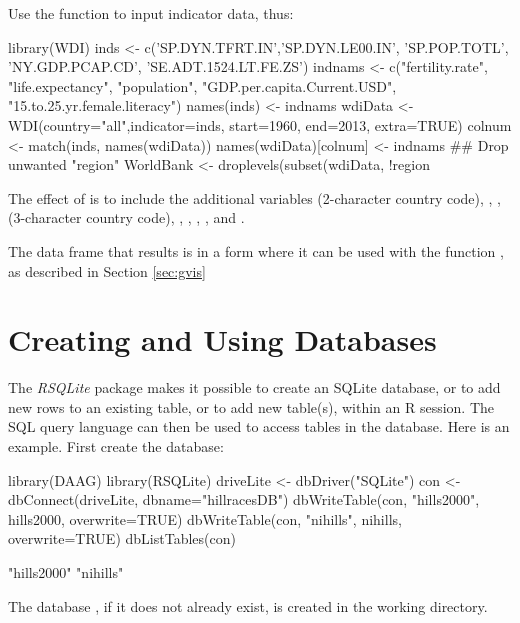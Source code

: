Use the function  to input indicator data, thus:
\begin{fullwidth}
\begin{Schunk}
\begin{Sinput}
library(WDI)
inds <- c('SP.DYN.TFRT.IN','SP.DYN.LE00.IN', 'SP.POP.TOTL',
 'NY.GDP.PCAP.CD', 'SE.ADT.1524.LT.FE.ZS')
indnams <- c("fertility.rate", "life.expectancy", "population",
             "GDP.per.capita.Current.USD", "15.to.25.yr.female.literacy")
names(inds) <- indnams
wdiData <- WDI(country="all",indicator=inds, start=1960, end=2013, extra=TRUE)
colnum <- match(inds, names(wdiData))
names(wdiData)[colnum] <- indnams
## Drop unwanted "region"
WorldBank <- droplevels(subset(wdiData, !region %in% "Aggregates"))
\end{Sinput}
\end{Schunk}
\end{fullwidth}
The effect of  is to include the additional variables
 (2-character country code), , ,
 (3-character country code), ,
, , ,  and
.

The data frame  that results is in a form where it can
be used with the  function ,
as described in Section \ref{sec:gvis}

\section{Creating and Using Databases}\label{ss:dbase}

The \textit{RSQLite} package makes it possible to create an
SQLite database, or to add new rows to an existing table,
or to add new table(s), within an R session. The SQL query
language can then be used to access tables in the database.
Here is an example. First create the database:

\noindent
\begin{Schunk}
\begin{Sinput}
library(DAAG)
library(RSQLite)
driveLite <- dbDriver("SQLite")
con <- dbConnect(driveLite, dbname="hillracesDB")
dbWriteTable(con, "hills2000", hills2000,
             overwrite=TRUE)
dbWriteTable(con, "nihills", nihills,
             overwrite=TRUE)
dbListTables(con)
\end{Sinput}
\begin{Soutput}
[1] "hills2000" "nihills"  
\end{Soutput}
\end{Schunk}
The database , if it does not already exist,
is created in the working directory.

